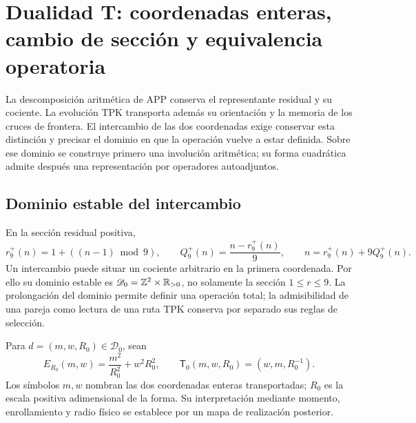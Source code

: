 \section{Dualidad T: coordenadas enteras, cambio de sección y equivalencia operatoria}
\label{iv:dualidad}

La descomposición aritmética de APP conserva el representante residual
y su cociente. La evolución TPK transporta además su orientación y
la memoria de los cruces de frontera. El intercambio de las dos
coordenadas exige conservar esta distinción y precisar el dominio
en que la operación vuelve a estar definida. Sobre ese dominio se
construye primero una involución aritmética; su forma cuadrática
admite después una representación por operadores autoadjuntos.

\subsection{Dominio estable del intercambio}

En la sección residual positiva,
\begin{equation}
 r_9^+(n)=1+((n-1)\bmod9),\qquad
 Q_9^+(n)=\frac{n-r_9^+(n)}9,
 \qquad n=r_9^+(n)+9Q_9^+(n).
 \label{iv:eq:division-positiva}
\end{equation}
Un intercambio puede situar un cociente arbitrario en la primera
coordenada. Por ello su dominio estable es
\(\mathscr D_0=\mathbb Z^2\times\mathbb R_{>0}\), no solamente la sección
\(1\leq r\leq9\). La prolongación del dominio permite definir
una operación total; la admisibilidad de una pareja como lectura de
una ruta TPK conserva por separado sus reglas de selección.

\begin{definition}
\label{iv:def:dualidad}
Para \(d=(m,w,R_0)\in\mathscr D_0\), sean
\begin{equation}
 E_{R_0}(m,w)=\frac{m^2}{R_0^2}+w^2R_0^2,
 \qquad
 \mathsf T_0(m,w,R_0)=(w,m,R_0^{-1}).
 \label{iv:eq:energia-t}
\end{equation}
Los símbolos \(m,w\) nombran las dos coordenadas enteras
transportadas; \(R_0\) es la escala positiva adimensional de
la forma. Su interpretación mediante momento, enrollamiento y
radio físico se establece por un mapa de realización posterior.
\end{definition}

